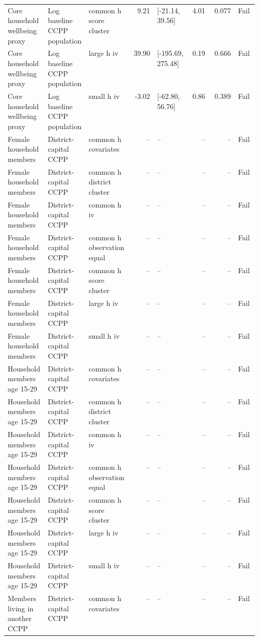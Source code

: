 \begin{longtable}{@{}p{0.16\linewidth}p{0.14\linewidth}p{0.14\linewidth}rp{0.13\linewidth}rrl@{}}
Core household wellbeing proxy & Log baseline CCPP population & common h score cluster & 9.21 & [-21.14, 39.56] & 4.01 & 0.077 & Fail \\
Core household wellbeing proxy & Log baseline CCPP population & large h iv & 39.90 & [-195.69, 275.48] & 0.19 & 0.666 & Fail \\
Core household wellbeing proxy & Log baseline CCPP population & small h iv & -3.02 & [-62.80, 56.76] & 0.86 & 0.389 & Fail \\
Female household members & District-capital CCPP & common h covariates & -- & -- & -- & -- & Fail \\
Female household members & District-capital CCPP & common h district cluster & -- & -- & -- & -- & Fail \\
Female household members & District-capital CCPP & common h iv & -- & -- & -- & -- & Fail \\
Female household members & District-capital CCPP & common h observation equal & -- & -- & -- & -- & Fail \\
Female household members & District-capital CCPP & common h score cluster & -- & -- & -- & -- & Fail \\
Female household members & District-capital CCPP & large h iv & -- & -- & -- & -- & Fail \\
Female household members & District-capital CCPP & small h iv & -- & -- & -- & -- & Fail \\
Household members age 15-29 & District-capital CCPP & common h covariates & -- & -- & -- & -- & Fail \\
Household members age 15-29 & District-capital CCPP & common h district cluster & -- & -- & -- & -- & Fail \\
Household members age 15-29 & District-capital CCPP & common h iv & -- & -- & -- & -- & Fail \\
Household members age 15-29 & District-capital CCPP & common h observation equal & -- & -- & -- & -- & Fail \\
Household members age 15-29 & District-capital CCPP & common h score cluster & -- & -- & -- & -- & Fail \\
Household members age 15-29 & District-capital CCPP & large h iv & -- & -- & -- & -- & Fail \\
Household members age 15-29 & District-capital CCPP & small h iv & -- & -- & -- & -- & Fail \\
Members living in another CCPP & District-capital CCPP & common h covariates & -- & -- & -- & -- & Fail \\

\end{longtable}
